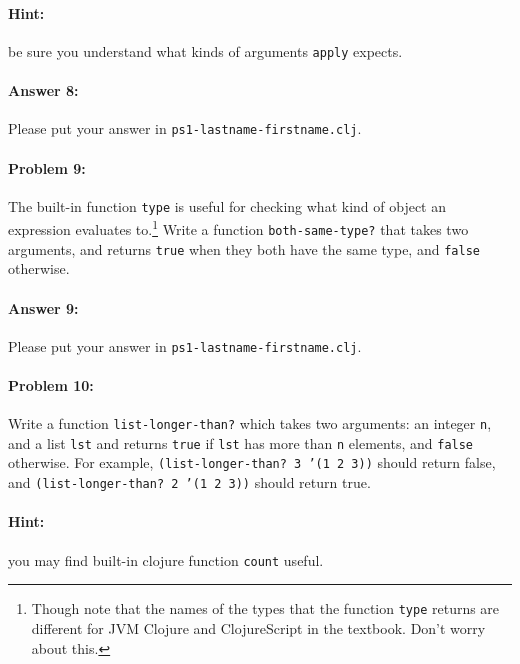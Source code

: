 \documentclass[10pt]{article}
\newcommand{\PSnum}{1}
\begin{document}
\paragraph{Hint:} be sure you understand what kinds of arguments \texttt{apply} expects.

\paragraph{Answer 8:} Please put your answer in \texttt{ps\PSnum-lastname-firstname.clj}.

\noindent\hrulefill%

\paragraph{Problem 9:}
The built-in function \texttt{type} is useful for checking what kind of object
an expression evaluates to.\footnote{Though note that the names of the types
that the function \texttt{type} returns are different for JVM Clojure and ClojureScript
in the textbook.  Don't worry about this.}
Write a function \texttt{both-same-type?} that takes two arguments, and returns
\texttt{true} when they both have the same type, and \texttt{false} otherwise.

\paragraph{Answer 9:} Please put your answer in \texttt{ps\PSnum-lastname-firstname.clj}.

\noindent\hrulefill%

\paragraph{Problem 10:}
Write a function \texttt{list-longer-than?} which takes two arguments: an integer \texttt{n}, and a list \texttt{lst} and returns \texttt{true} if \texttt{lst} has more than \texttt{n} elements, and \texttt{false} otherwise. For example, \texttt{(list-longer-than? 3 '(1 2 3))} should return false, and \texttt{(list-longer-than? 2 '(1 2 3))} should return true.

\paragraph*{Hint:} you may find built-in clojure function \texttt{count} useful.
\end{document}
